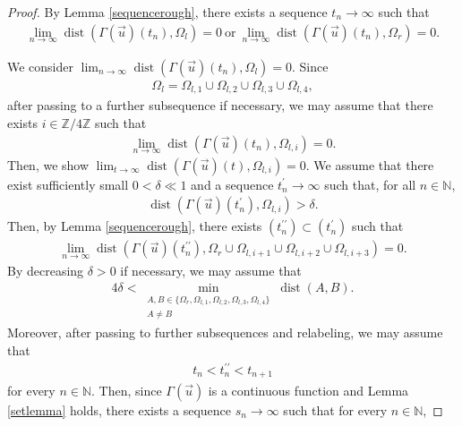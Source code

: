 \documentclass[10pt,a4paper]{amsart}
\numberwithin{equation}{section}
\begin{document}
\begin{proof}
By Lemma \ref{sequencerough}, there exists a sequence $t_n\to\infty$ such that 
\begin{align*}
\lim_{n\to\infty}\operatorname{dist}\left(\Gamma(\vec{u})(t_n),\Omega_l\right)=0\ \mbox{or}\ \lim_{n\to\infty}\operatorname{dist}\left(\Gamma(\vec{u})(t_n),\Omega_r\right)=0. 
\end{align*}

We consider $\lim_{n\to\infty}\operatorname{dist}\left(\Gamma(\vec{u})(t_n),\Omega_l\right)=0$. Since
\begin{align*}
\Omega_l=\Omega_{l,1}\cup\Omega_{l,2}\cup\Omega_{l,3}\cup\Omega_{l,4},
\end{align*}
after passing to a further subsequence if necessary, we may assume that there exists $i\in\mathbb{Z}/4\mathbb{Z}$ such that
\begin{align*}
\lim_{n\to\infty}\operatorname{dist}\left(\Gamma(\vec{u})(t_n),\Omega_{l,i}\right)=0.
\end{align*}
Then, we show $\lim_{t\to\infty}\operatorname{dist}\left(\Gamma(\vec{u})(t),\Omega_{l,i}\right)=0$. We assume that there exist sufficiently small $0<\delta\ll 1$ and a sequence $t_n^{\prime}\to \infty$ such that, for all $n\in\mathbb{N}$,
\begin{align*}
\operatorname{dist}\left(\Gamma(\vec{u})(t_n^{\prime}),\Omega_{l,i}\right)>\delta.
\end{align*}
Then, by Lemma \ref{sequencerough}, there exists $(t_n^{\prime \prime})\subset (t_n^{\prime})$ such that 
\begin{align*}
\lim_{n\to\infty}\operatorname{dist}\left(\Gamma(\vec{u})(t_n^{\prime \prime}),\Omega_r\cup \Omega_{l,i+1}\cup \Omega_{l,i+2}\cup \Omega_{l,i+3} \right)=0.
\end{align*}
By decreasing $\delta>0$ if necessary, we may assume that
\begin{align*}
4\delta<\min_{\substack{A,B\in\{\Omega_r,\Omega_{l,1},\Omega_{l,2},\Omega_{l,3},\Omega_{l,4}\}
\\
A\neq B}}\operatorname{dist}(A,B).
\end{align*}
Moreover, after passing to further subsequences and relabeling, we may
assume that
\begin{align*}
t_n<t_n^{\prime\prime}<t_{n+1}
\end{align*}
for every $n\in\mathbb{N}$. Then, since $\Gamma(\vec{u})$ is a continuous function and Lemma \ref{setlemma} holds, there exists a sequence $s_n\to \infty$ such that for every $n\in\mathbb{N}$,

\end{proof}
\end{document}
